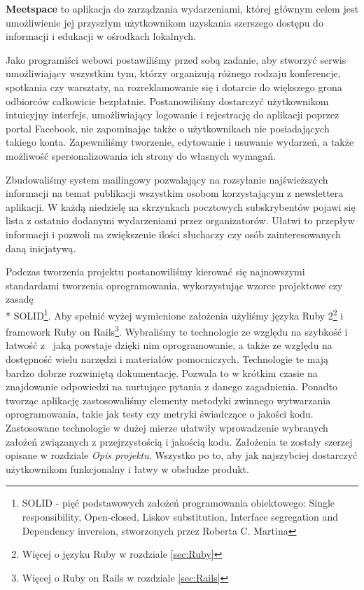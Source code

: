 \textbf{Meetspace} to aplikacja do zarządzania wydarzeniami, której głównym celem jest umożliwienie jej przyszłym użytkownikom uzyskania szerszego dostępu do informacji i edukacji w ośrodkach lokalnych.


Jako programiści webowi postawiliśmy przed sobą zadanie, aby stworzyć serwis umożliwiający wszystkim tym, którzy organizują różnego rodzaju konferencje, spotkania czy warsztaty, na rozreklamowanie się i dotarcie do większego grona odbiorców całkowicie bezpłatnie.
Postanowiliśmy dostarczyć użytkownikom intuicyjny interfejs, umożliwiający logowanie i rejestrację do aplikacji poprzez portal Facebook, nie zapominając także o użytkownikach nie posiadających takiego konta. Zapewniliśmy tworzenie, edytowanie i usuwanie wydarzeń, a także
możliwość spersonalizowania ich strony do własnych wymagań.


Zbudowaliśmy system mailingowy pozwalający na rozsyłanie najświeższych informacji na temat publikacji wszystkim osobom korzystającym z newslettera aplikacji. W każdą niedzielę na skrzynkach pocztowych subskrybentów pojawi się lista z ostatnio dodanymi wydarzeniami przez organizatorów. Ułatwi to przepływ informacji i pozwoli na zwiększenie ilości słuchaczy czy osób zainteresowanych daną inicjatywą.

Podczas tworzenia projektu postanowiliśmy kierować się najnowszymi standardami tworzenia oprogramowania, wykorzystując wzorce projektowe czy zasadę \\* SOLID\footnote{SOLID - pięć podstawowych założeń programowania obiektowego: Single responsibility, Open-closed, Liskov substitution, Interface segregation and Dependency inversion, stworzonych przez Roberta C. Martina}. Aby spełnić wyżej wymienione założenia użyliśmy języka  Ruby 2\footnote{Więcej o języku Ruby w rozdziale \ref{sec:Ruby}} i framework  Ruby on Rails\footnote{Więcej o Ruby on Rails w rozdziale \ref{sec:Rails}}. Wybraliśmy te technologie ze względu na szybkość i łatwość z~ jaką powstaje dzięki nim oprogramowanie, a także ze względu na dostępność wielu narzędzi i materiałów pomocniczych. Technologie te mają bardzo dobrze rozwiniętą dokumentację. Pozwala to w krótkim czasie na znajdowanie odpowiedzi na nurtujące pytania z danego zagadnienia. Ponadto tworząc aplikację zastosowaliśmy elementy metodyki zwinnego wytwarzania oprogramowania, takie jak testy czy metryki świadczące o jakości kodu. Zastosowane technologie w dużej mierze ułatwiły wprowadzenie wybranych założeń związanych z przejrzystością i jakością kodu. Założenia te zostały szerzej opisane w rozdziale \emph{Opis projektu}.
Wszystko po to, aby jak najszybciej dostarczyć użytkownikom funkcjonalny i łatwy w obsłudze produkt.
